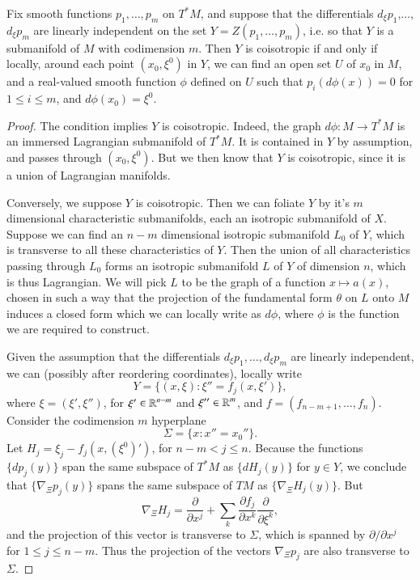 \begin{theorem}
    Fix smooth functions $p_1,\dots,p_m$ on $T^* M$, and suppose that the differentials $d_\xi p_1$,$\dots$,$d_\xi p_m$ are linearly independent on the set $Y = Z(p_1,\dots,p_m)$, i.e. so that $Y$ is a submanifold of $M$ with codimension $m$. Then $Y$ is coisotropic if and only if locally, around each point $(x_0,\xi^0)$ in $Y$, we can find an open set $U$ of $x_0$ in $M$, and a real-valued smooth function $\phi$ defined on $U$ such that $p_i(d \phi(x)) = 0$ for $1 \leq i \leq m$, and $d\phi(x_0) = \xi^0$.
\end{theorem}
\begin{proof}
    The condition implies $Y$ is coisotropic. Indeed, the graph $d \phi: M \to T^* M$ is an immersed Lagrangian submanifold of $T^* M$. It is contained in $Y$ by assumption, and passes through $(x_0,\xi^0)$. But we then know that $Y$ is coisotropic, since it is a union of Lagrangian manifolds.

    Conversely, we suppose $Y$ is coisotropic. Then we can foliate $Y$ by it's $m$ dimensional characteristic submanifolds, each an isotropic submanifold of $X$. Suppose we can find an $n - m$ dimensional isotropic submanifold $L_0$ of $Y$, which is transverse to all these characteristics of $Y$. Then the union of all characteristics passing through $L_0$ forms an isotropic submanifold $L$ of $Y$ of dimension $n$, which is thus Lagrangian. We will pick $L$ to be the graph of a function $x \mapsto a(x)$, chosen in such a way that the projection of the fundamental form $\theta$ on $L$ onto $M$ induces a closed form which we can locally write as $d\phi$, where $\phi$ is the function we are required to construct.

    Given the assumption that the differentials $d_\xi p_1, \dots, d_\xi p_m$ are linearly independent, we can (possibly after reordering coordinates), locally write
    \[ Y = \{ (x,\xi): \xi'' = f_j(x,\xi') \}, \]
    where $\xi = (\xi', \xi'')$, for $\xi' \in \operatorname{\mathbb{R}}^{n-m}$ and $\xi'' \in \operatorname{\mathbb{R}}^m$, and $f = (f_{n-m+1},\dots,f_n)$. Consider the codimension $m$ hyperplane
    \[ \Sigma = \{ x : x'' = x_0'' \}. \]
    Let $H_j = \xi_j - f_j(x, (\xi^0)')$, for $n-m < j \leq n$. Because the functions $\{ dp_j(y) \}$ span the same subspace of $T^* M$ as $\{ dH_j(y) \}$ for $y \in Y$, we conclude that $\{ \nabla_\Xi p_j(y) \}$ spans the same subspace of $TM$ as $\{ \nabla_\Xi H_j(y) \}$. But
    \[ \nabla_\Xi H_j = \frac{\partial}{\partial x^j} + \sum_k \frac{\partial f_j}{\partial x^k} \frac{\partial}{\partial \xi^k}, \]
    and the projection of this vector is transverse to $\Sigma$, which is spanned by $\partial / \partial x^j$ for $1 \leq j \leq n-m$. Thus the projection of the vectors $\nabla_\Xi p_j$ are also transverse to $\Sigma$.


\end{proof}
